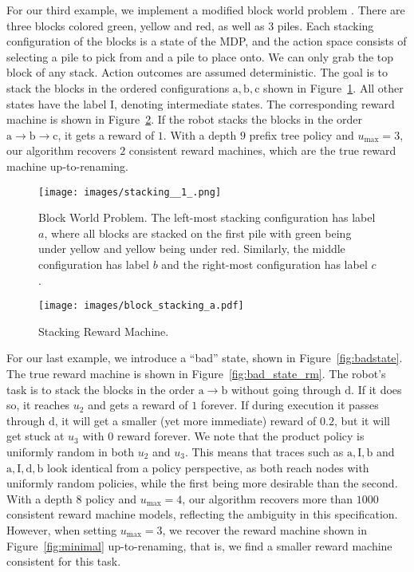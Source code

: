 \documentclass[letterpaper, 10 pt, conference]{ieeeconf}
\begin{document}
For our third example, we implement a modified block world problem \cite{khodeir2023learning,wolfe2006decision}. There are three blocks colored green, yellow and red, as well as 3 piles. Each stacking configuration of the blocks is a state of the MDP, and the action space consists of selecting a pile to pick from and a pile to place onto. We can only grab the top block of any stack. %
Action outcomes are assumed deterministic. The goal is to stack the blocks in the ordered configurations $\mathrm{a,b,c}$ shown in Figure~\ref{fig:stacking_mdp}. All other states have the label $\mathrm{I}$, denoting intermediate states. The corresponding reward machine is shown in Figure~\ref{fig:stacking_rm}. If the robot stacks the blocks in the order $\mathrm{a} \to \mathrm{b} \to \mathrm{c}$, it gets a reward of $1$. With a depth $9$ prefix tree policy and $u_{\mathrm{max}} = 3$, our algorithm recovers $2$ consistent reward machines, which are the true reward machine up-to-renaming.

\begin{figure}
    \centering
    \texttt{[image: images/stacking\_\_1\_.png]}
    \caption{Block World Problem. The left-most stacking configuration has label $a$, where all blocks are stacked on the first pile with green being under yellow and yellow being under red. Similarly, the middle configuration has label $b$ and the right-most configuration has label $c$.}
    \label{fig:stacking_mdp}
    \vspace{-0.2cm}
\end{figure}

\begin{figure}[h!]
    \centering
    \texttt{[image: images/block\_stacking\_a.pdf]}
    \caption{Stacking Reward Machine.}
    \label{fig:stacking_rm}
    \vspace{-0.3cm}
\end{figure}

For our last example, we introduce a ``bad'' state, shown in Figure~\ref{fig:badstate}. The true reward machine is shown in Figure~\ref{fig:bad_state_rm}.  The robot's task is to stack the blocks in the order $\mathrm{a} \to \mathrm{b}$ without going through $\mathrm{d}$. If it does so, it reaches $u_2$ and gets a reward of $1$ forever. If during execution it passes through $\mathrm{d}$, it will get a smaller (yet more immediate) reward of $0.2$, but it will get stuck at $u_3$ with $0$ reward forever. We note that the product policy is uniformly random in both $u_2$ and $u_3$. This means that traces such as  $\mathrm{a,I,b}$ and $\mathrm{a,I,d,b}$ look identical from a policy perspective, as both reach nodes with uniformly random policies, while the first being more desirable than the second. With a depth $8$ policy and $u_{\mathrm{max}} = 4$, our algorithm recovers more than $1000$ consistent reward machine models, reflecting the ambiguity in this specification. However, when setting $u_{\mathrm{max}} = 3$, we recover the reward machine shown in Figure~\ref{fig:minimal} up-to-renaming, that is, we find a smaller reward machine consistent for this task. 
\end{document}
